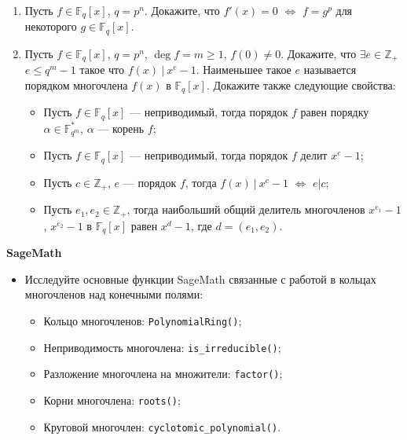 \begin{enumerate}[topsep=0pt]
    \item Пусть $f \in \mathbb{F}_q[x]$, $q=p^n$. Докажите, что $f'(x)=0$ $\Leftrightarrow$ $f=g^p$ для некоторого $g \in \mathbb{F}_q[x]$. %
    
    \item Пусть $f\in \mathbb{F}_q[x]$, $q=p^n$, $\deg f = m \geqslant 1$, $f(0) \neq 0$. Докажите, что $\exists e \in \mathbb{Z_+}$ $e\leqslant q^m-1$ такое что $f(x)\ |\ x^e-1$. Наименьшее такое $e$ называется порядком многочлена $f(x)$ в $\mathbb{F}_q[x]$. Докажите также следующие свойства:
    \begin{itemize}[noitemsep,topsep=0pt]
        \item Пусть $f\in \mathbb{F}_q[x]$ --- неприводимый, тогда порядок $f$ равен порядку $\alpha \in \mathbb{F}_{q^m}^*$, $\alpha$ --- корень $f$;
        \item Пусть $f\in \mathbb{F}_q[x]$ --- неприводимый, тогда порядок $f$ делит $x^e-1$;
        \item Пусть $c\in \mathbb{Z}_+$, $e$ --- порядок $f$, тогда $f(x)\ |\ x^c-1$ $\Leftrightarrow$ $e|c$;
        \item Пусть $e_1, e_2\in \mathbb{Z}_+$, тогда наибольший общий делитель многочленов $x^{e_1}-1$, $x^{e_2}-1$ в $\mathbb{F}_q[x]$ равен $x^d-1$, где $d=(e_1,e_2)$.

        
    \end{itemize} %
\end{enumerate}

\noindent\textbf{SageMath}
\begin{itemize}[topsep=0pt]
    \item Исследуйте основные функции SageMath связанные с работой в кольцах многочленов над конечными полями:
    \begin{itemize}[noitemsep,topsep=0pt]
        \item Кольцо многочленов: \texttt{PolynomialRing()};
        \item Неприводимость многочлена: \texttt{is\_irreducible()};
        \item Разложение многочлена на множители: \texttt{factor()};
        \item Корни многочлена: \texttt{roots()};
        \item Круговой многочлен: \texttt{cyclotomic\_polynomial()}.
     \end{itemize}
        
\end{itemize}

